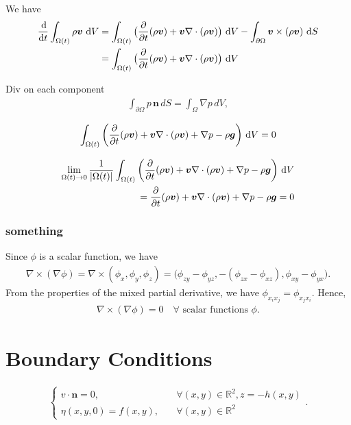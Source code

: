 \documentclass[12pt]{article}
\begin{document}
We have
\begin{align}
	\begin{aligned}
	    \frac{\operatorname{d}\!}{\operatorname{d}\! t} \int_{\Omega(t)} \rho \bm{v} \, \operatorname{d}\! V 
	        & = \int_{\Omega(t)} \big(\frac{\partial}{\partial t}(\rho \bm{v})
	                + \bm{v} \nabla \cdot (\rho \bm{v}) \big) \, \operatorname{d}\! V
	                - \int_{\partial \Omega} \bm{v} \times (\rho \bm{v}) \, \operatorname{d}\! S \\
	        & = \int_{\Omega(t)} \big(\frac{\partial}{\partial t}(\rho \bm{v})
	                + \bm{v} \nabla \cdot (\rho \bm{v}) \big) \, \operatorname{d}\! V                
	\end{aligned}
\end{align}

Div on each component
\begin{align}
    \int_{\partial \Omega} p \, \bm{n} \, d S = \int_{\Omega} \nabla p \, d V,
\end{align}

\begin{align}
    \int_{\Omega(t)} \bigg(\frac{\partial}{\partial t}(\rho \bm{v})
	                + \bm{v} \nabla \cdot (\rho \bm{v}) + \nabla p - \rho \bm{g} \bigg) \, \operatorname{d}\! V = 0
\end{align}

\begin{align}
    \lim_{\Omega(t) \rightarrow 0} \frac{1}{|\Omega(t)|}\int_{\Omega(t)} \bigg(\frac{\partial}{\partial t}(\rho \bm{v})
	                + \bm{v} \nabla \cdot (\rho \bm{v}) + \nabla p - \rho \bm{g} \bigg) \, \operatorname{d}\! V \\
	                = \frac{\partial}{\partial t}(\rho \bm{v})
	                + \bm{v} \nabla \cdot (\rho \bm{v}) + \nabla p - \rho \bm{g} = 0
\end{align}

\subsubsection*{something}

Since $\phi$ is a scalar function, we have
\begin{align}
    \nabla \times (\nabla \phi) = \nabla \times (\phi_x, \phi_y, \phi_z) =
        \big(\phi_{zy} - \phi_{yz}, -(\phi_{zx} - \phi_{xz}), \phi_{xy} - \phi_{yx} \big).
\end{align}
From the properties of the mixed partial derivative, we have $\phi_{x_i x_j} = \phi_{x_j x_i}$. Hence,
\begin{align}
    \nabla \times (\nabla \phi) = 0 \quad \forall \text{ scalar functions } \phi.
\end{align}


\section{Boundary Conditions}

\begin{align}
	\begin{cases}
	    v\cdot \bm{n} = 0,    &  \quad  \forall (x,y) \in \mathbb{R}^2, z = -h(x,y) \\
	    \eta(x,y,0) = f(x,y), &  \quad  \forall (x,y) \in \mathbb{R}^2
	\end{cases}.
\end{align}
\end{document}
